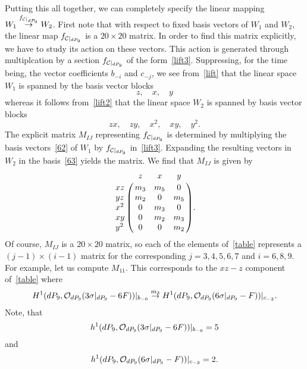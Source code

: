 \documentclass[a4paper,12pt]{article}
\numberwithin{equation}{section}
\theoremstyle{plain}
\begin{document}
Putting this all together, we can completely specify the linear mapping
$W_1 \stackrel{f_{{\cal{C}}|_{dP_{9}}}}{\rightarrow} W_2$.
First note that with respect to fixed basis vectors of $W_{1}$ and
$W_{2}$,
the linear map $f_{{\cal{C}}|_{dP_{9}}}$ is a $20 \times 20$ matrix. In
order
to find this matrix explicitly, we have to study its action on these
vectors. This action is generated through
multiplcation by a section $f_{{\cal{C}}|_{dP_{9}}}$
of the form~\eqref{lift3}. Suppressing, for
the time being, the vector coefficients $b_{-i}$ and $c_{-j}$,
we see from~\eqref{lift} that the linear space $W_1$ is spanned by the
basis vector blocks
%
\begin{equation}
z, \quad x, \quad y
\label{62}
\end{equation}
%
whereas it follows from~\eqref{lift2} that the linear space $W_2$ is
spanned by basis vector blocks
%
\begin{equation}
zx, \quad zy, \quad x^2, \quad xy, \quad y^2.
\label{63}
\end{equation}
%
The explicit matrix $M_{IJ}$ representing
$f_{{\cal{C}}|_{dP_{9}}}$ is determined by multiplying the
basis vectors~\eqref{62} of $W_{1}$ by $f_{{\cal{C}}|_{dP_{9}}}$
in~\eqref{lift3}. Expanding the
resulting vectors in $W_{2}$ in the
basis~\eqref{63} yields the matrix.  We find that $M_{IJ}$ is given by
%
\begin{equation}
\bordermatrix{    & z   & x   & y  \cr
              xz  & m_3 & m_5 & 0  \cr
              yz  & m_2 & 0   & m_5 \cr
              x^2 & 0   & m_3 & 0   \cr
              xy  & 0   & m_2 & m_3 \cr
              y^2 & 0   & 0   & m_2 \cr}.
\label{table}
\end{equation}
%
Of course, $M_{IJ}$ is a $20 \times 20$ matrix, so each of the elements
of~\eqref{table} represents
a $(j-1) \times (i-1)$ matrix for the corresponding $j=3, 4, 5, 6, 7$
and $i=6, 8, 9$.
For example, let us compute $M_{11}$. This
corresponds to the $xz - z$ component of~\eqref{table} where
%
\begin{equation}
H^{1} (dP_9, {\cal O}_{dP_9} (3 \sigma|_{dP_9} -6F))|_{b_{-6}}
\stackrel{m_3}{\rightarrow}
H^{1} (dP_9, {\cal O}_{dP_9} (6 \sigma|_{dP_9} -F))|_{c_{-3}}.
\label{64}
\end{equation}
%
Note, that
%
\begin{equation}
h^{1} (dP_9, {\cal O}_{dP_9} (3 \sigma|_{dP_9} -6F))|_{b_{-6}} =5
\label{65}
\end{equation}
%
and
%
\begin{equation}
h^{1} (dP_9, {\cal O}_{dP_9} (6 \sigma|_{dP_9} -F))|_{c_{-3}} =2.
\label{66}
\end{equation}
\end{document}
